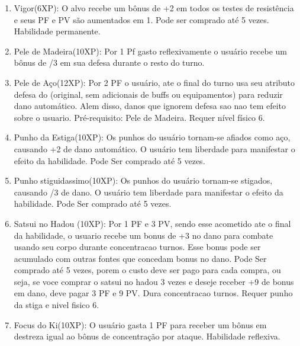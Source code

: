 \begin{enumerate}

		\item Vigor(6XP): O alvo recebe um bônus de +2 em todos os testes de resistência e seus PF e PV são aumentados em 1. Pode ser comprado até 5 vezes. Habilidade permanente.
  
  	\item Pele de Madeira(10XP): Por 1 Pf gasto reflexivamente o usuário recebe um bônus de /3 em sua defesa durante o resto do turno. 
  	
  	\item Pele de Aço(12XP): Por 2 PF o usuário, ate o final do turno usa seu atributo defesa do (original, sem adicionais de buffs ou equipamentos) para reduzir dano automático. Alem disso, danos que ignorem defesa sao nao tem efeito sobre o usuario. Pré-requisito: Pele de Madeira. Requer nível físico 6.

  
  	\item Punho da Estiga(10XP): Os punhos do usuário tornam-se afiados como aço, causando +2 de dano automático. O usuário tem liberdade para manifestar o efeito da habilidade. Pode Ser comprado até 5 vezes.

  	\item Punho stiguidassimo(10XP): Os punhos do usuário tornam-se stigados, causando /3 de dano. O usuário tem liberdade para manifestar o efeito da habilidade. Pode Ser comprado até 5 vezes.

  	\item Satsui no Hadou (10XP): Por 1 PF e 3 PV, sendo esse acometido ate o final da habilidade, o usuario recebe um bonus de +3 no dano para combate usando seu corpo durante concentracao turnos. Esse bonus pode ser acumulado com outras fontes que concedam bonus no dano. Pode Ser comprado até 5 vezes, porem o custo deve ser pago para cada compra, ou seja, se voce comprar o satsui no hadou 3 vezes e deseje receber +9 de bonus em dano, deve pagar 3 PF e 9 PV. Dura concentracao turnos. Requer punho da stiga e nivel fisico 6.

  	\item Focus do Ki(10XP): O usuário gasta 1 PF para receber um bônus em destreza igual ao bônus de concentração por ataque. Habilidade reflexiva.


\end{enumerate}
